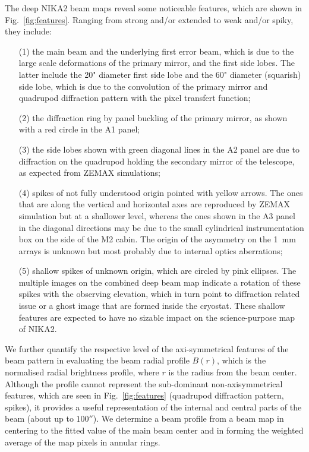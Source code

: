 The deep NIKA2 beam maps reveal some noticeable features, which are
shown in Fig.~\ref{fig:features}. Ranging from strong and/or extended to
weak and/or spiky, they include:
\begin{itemize}
\item[(1)] the main beam and the underlying first error
  beam, which is due to the large scale deformations of the primary
  mirror, and the first side lobes. The latter include 
  the 20" diameter first side lobe and the 60" diameter (squarish)
  side lobe, which is due to the convolution of the primary mirror and quadrupod
  diffraction pattern with the pixel transfert function;
\item[(2)] the diffraction ring by panel buckling of the primary
  mirror, as shown with a red circle in the A1 panel;
\item[(3)] the side lobes shown with green
  diagonal lines in the A2 panel are due to diffraction on the
  quadrupod holding the secondary mirror of the telescope, as expected
  from ZEMAX simulations;  
\item[(4)] spikes of not fully understood origin pointed with yellow
  arrows. The ones that are along the vertical and
  horizontal axes are reproduced by ZEMAX simulation but at a 
  shallower level, whereas the ones shown in the A3 panel in the
  diagonal directions may be due to the small cylindrical
  instrumentation box on the side of the M2 cabin. The origin of the
  asymmetry on the 1~mm arrays is unknown but most probably due to
  internal optics aberrations;
\item[(5)] shallow spikes of unknown origin, which are circled by pink
  ellipses. The multiple images on the combined deep beam map indicate
  a rotation of these spikes with the observing elevation, which in
  turn point to diffraction related issue or a ghost image that are
  formed inside the cryostat. These shallow features are expected to
  have no sizable impact on the science-purpose map of NIKA2.
\end{itemize}

We further quantify the respective level of the axi-symmetrical
features of the beam pattern in evaluating the beam radial profile
$B(r)$, which is the normalised radial brightness profile,
where $r$ is the radius from the beam center.
Although the profile cannot represent the sub-dominant non-axisymmetrical
features, which are seen in Fig.~\ref{fig:features} (quadrupod
diffraction pattern, spikes), it provides a useful
representation of the internal and central parts of the beam (about up to
$100''$). We determine a beam profile from a beam map in centering to
the fitted value of the main beam center and in forming the
weighted average of the map pixels in annular rings.

